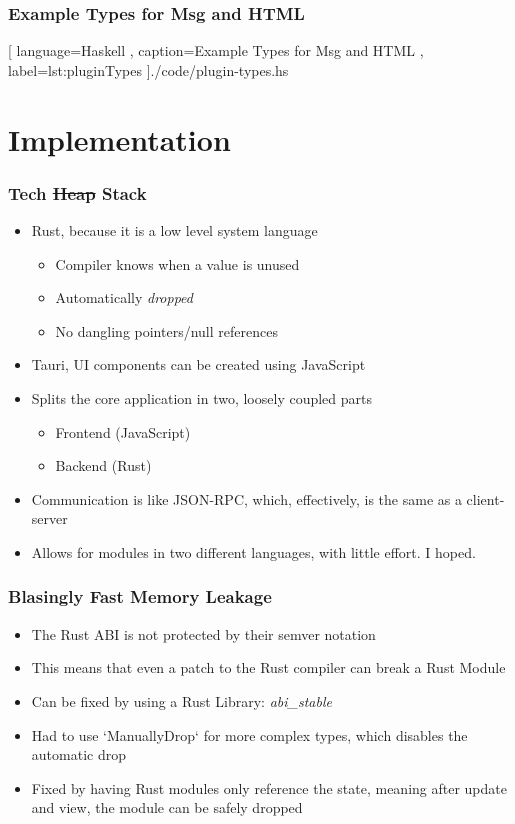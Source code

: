 \begin{frame}
  \frametitle{Example Types for Msg and HTML}
    \begin{center}
      
      [ language=Haskell
      , caption={Example Types for Msg and HTML}
      , label=lst:pluginTypes
      ]{./code/plugin-types.hs}
    \end{center}
\end{frame}

\section{Implementation}
\SectionPage

\begin{frame}
  \frametitle{Tech \sout{Heap} Stack}
  \begin{itemize}
    \item Rust, because it is a low level system language
      \pause
      \begin{itemize}
        \item Compiler knows when a value is unused
          \pause
        \item Automatically \textit{dropped}
          \pause
        \item No dangling pointers/null references
      \end{itemize}
      \pause
    \item Tauri, UI components can be created using JavaScript
      \pause
    \item Splits the core application in two, loosely coupled parts
      \begin{itemize}
        \item Frontend (JavaScript)
          \pause
        \item Backend (Rust)
      \end{itemize}
      \pause
    \item Communication is like JSON-RPC, which, effectively, is the same as a
      client-server
      \pause
    \item Allows for modules in two different languages, with little effort.
      I hoped.
  \end{itemize}
\end{frame}

\begin{frame}
  \frametitle{Blasingly Fast Memory Leakage}
  \begin{itemize}
    \item The Rust ABI is not protected by their semver notation
      \pause
    \item This means that even a patch to the Rust compiler can break a
      Rust Module
      \pause
    \item Can be fixed by using a Rust Library: \textit{abi\_stable}
      \pause
    \item Had to use `ManuallyDrop` for more complex types, which disables
      the automatic drop
      \pause
    \item Fixed by having Rust modules only reference the state, meaning
      after update and view, the module can be safely dropped
  \end{itemize}
\end{frame}

